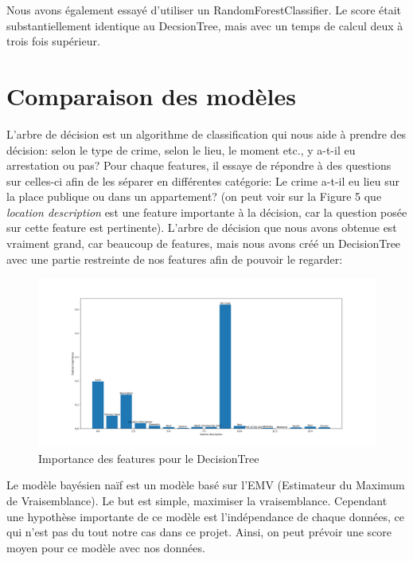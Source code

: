 \documentclass{article}
\begin{document}
    Nous avons également essayé d'utiliser un RandomForestClassifier. Le score était substantiellement
    identique au DecsionTree, mais avec un temps de calcul deux à trois fois supérieur.

    \section{Comparaison des modèles}

    L'arbre de décision est un algorithme de classification qui nous aide 
    à prendre des décision:
    selon le type de crime, selon le lieu, le moment etc., y a-t-il eu arrestation ou pas?
    Pour chaque features, il essaye de répondre à des questions sur celles-ci afin
    de les séparer en différentes catégorie:
    Le crime a-t-il eu lieu sur la place publique ou dans un appartement?
    (on peut voir sur la Figure 5 que \textit{location description} est une feature
    importante à la décision, car la question posée sur cette feature est pertinente).
    L'arbre de décision que nous avons obtenue est vraiment grand, car beaucoup de
    features, mais nous avons créé un DecisionTree avec une partie restreinte de
    nos features afin de pouvoir le regarder: %

    \begin{figure}[H]
            \centering
	    \includegraphics[scale=.3]{images/feature_importance.png}
	    \caption{Importance des features pour le DecisionTree}
    \end{figure}


    Le modèle bayésien naïf est un modèle basé sur l'EMV
    (Estimateur du Maximum de Vraisemblance).
    Le but est simple, maximiser la vraisemblance. 
    Cependant une hypothèse importante de ce modèle est l'indépendance de chaque données,
    ce qui n'est pas du tout notre cas dans ce projet.
    Ainsi, on peut prévoir une score moyen pour ce modèle avec nos données.
\end{document}
